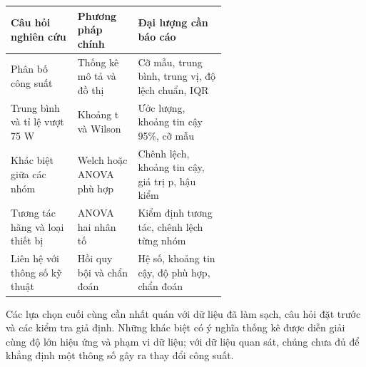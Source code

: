\begin{center}
\small
\renewcommand{\arraystretch}{1.22}
\begin{tabularx}{\linewidth}{@{}L{0.31\linewidth} L{0.29\linewidth} X@{}}
\toprule
{}
\textbf{Câu hỏi nghiên cứu} & \textbf{Phương pháp chính} & \textbf{Đại lượng cần báo cáo} \\
\midrule
Phân bố công suất & Thống kê mô tả và đồ thị & Cỡ mẫu, trung bình, trung vị, độ lệch chuẩn, IQR \\
Trung bình và tỉ lệ vượt 75 W & Khoảng t và Wilson & Ước lượng, khoảng tin cậy 95\%, cỡ mẫu \\
Khác biệt giữa các nhóm & Welch hoặc ANOVA phù hợp & Chênh lệch, khoảng tin cậy, giá trị p, hậu kiểm \\
Tương tác hãng và loại thiết bị & ANOVA hai nhân tố & Kiểm định tương tác, chênh lệch từng nhóm \\
Liên hệ với thông số kỹ thuật & Hồi quy bội và chẩn đoán & Hệ số, khoảng tin cậy, độ phù hợp, chẩn đoán \\
\bottomrule
\end{tabularx}
\end{center}


Các lựa chọn cuối cùng cần nhất quán với dữ liệu đã làm sạch, câu hỏi đặt trước và các kiểm tra giả định. Những khác biệt có ý nghĩa thống kê được diễn giải cùng độ lớn hiệu ứng và phạm vi dữ liệu; với dữ liệu quan sát, chúng chưa đủ để khẳng định một thông số gây ra thay đổi công suất.
